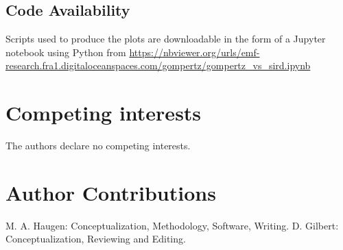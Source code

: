 \documentclass[review]{elsarticle}
\newcommand{\insertPdfFig}[3]{
  \begin{figure}[H]
  \centering
  \texttt{[image: \#1.pdf]}
  \caption{#2}
  \label{fig:#1}
  \end{figure}
}
\begin{document}
\subsection{Code Availability}

Scripts used to produce the plots are downloadable in the form of a Jupyter notebook using Python from 
\newline
\url{https://nbviewer.org/urls/emf-research.fra1.digitaloceanspaces.com/gompertz/gompertz_vs_sird.ipynb}

\section{Competing interests}
The authors declare no competing interests.

\section{Author Contributions}
M. A. Haugen: Conceptualization, Methodology, Software, Writing. D. Gilbert: Conceptualization, Reviewing and Editing.


\end{document}
